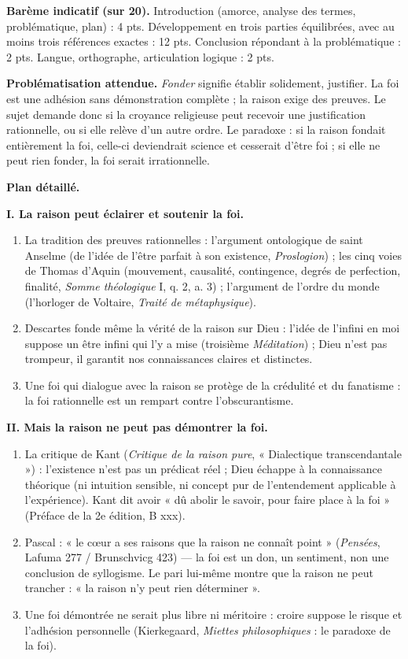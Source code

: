 \documentclass[11pt]{article}
\begin{document}
\begin{corrige}
\textbf{Barème indicatif (sur 20).} Introduction (amorce, analyse des termes, problématique, plan) : 4 pts. Développement en trois parties équilibrées, avec au moins trois références exactes : 12 pts. Conclusion répondant à la problématique : 2 pts. Langue, orthographe, articulation logique : 2 pts.

\textbf{Problématisation attendue.} \emph{Fonder} signifie établir solidement, justifier. La foi est une adhésion sans démonstration complète ; la raison exige des preuves. Le sujet demande donc si la croyance religieuse peut recevoir une justification rationnelle, ou si elle relève d'un autre ordre. Le paradoxe : si la raison fondait entièrement la foi, celle-ci deviendrait science et cesserait d'être foi ; si elle ne peut rien fonder, la foi serait irrationnelle.

\textbf{Plan détaillé.}

\textbf{I. La raison peut éclairer et soutenir la foi.}
\begin{enumerate}
\item La tradition des preuves rationnelles : l'argument ontologique de saint Anselme (de l'idée de l'être parfait à son existence, \emph{Proslogion}) ; les cinq voies de Thomas d'Aquin (mouvement, causalité, contingence, degrés de perfection, finalité, \emph{Somme théologique} I, q. 2, a. 3) ; l'argument de l'ordre du monde (l'horloger de Voltaire, \emph{Traité de métaphysique}).
\item Descartes fonde même la vérité de la raison sur Dieu : l'idée de l'infini en moi suppose un être infini qui l'y a mise (troisième \emph{Méditation}) ; Dieu n'est pas trompeur, il garantit nos connaissances claires et distinctes.
\item Une foi qui dialogue avec la raison se protège de la crédulité et du fanatisme : la foi rationnelle est un rempart contre l'obscurantisme.
\end{enumerate}

\textbf{II. Mais la raison ne peut pas démontrer la foi.}
\begin{enumerate}
\item La critique de Kant (\emph{Critique de la raison pure}, « Dialectique transcendantale ») : l'existence n'est pas un prédicat réel ; Dieu échappe à la connaissance théorique (ni intuition sensible, ni concept pur de l'entendement applicable à l'expérience). Kant dit avoir « dû abolir le savoir, pour faire place à la foi » (Préface de la 2e édition, B xxx).
\item Pascal : « le cœur a ses raisons que la raison ne connaît point » (\emph{Pensées}, Lafuma 277 / Brunschvicg 423) — la foi est un don, un sentiment, non une conclusion de syllogisme. Le pari lui-même montre que la raison ne peut trancher : « la raison n'y peut rien déterminer ».
\item Une foi démontrée ne serait plus libre ni méritoire : croire suppose le risque et l'adhésion personnelle (Kierkegaard, \emph{Miettes philosophiques} : le paradoxe de la foi).
\end{enumerate}


\end{corrige}
\end{document}
